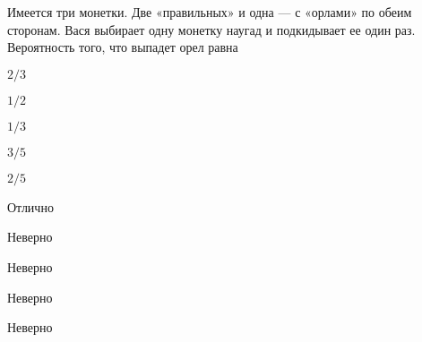 
\begin{question}
Имеется три монетки. Две «правильных» и одна --- с «орлами» по обеим
сторонам. Вася выбирает одну монетку наугад и подкидывает ее один раз.
Вероятность того, что выпадет орел равна
\begin{answerlist}
  \item \(2/3\)
  \item \(1/2\)
  \item \(1/3\)
  \item \(3/5\)
  \item \(2/5\)
\end{answerlist}
\end{question}

\begin{solution}
\begin{answerlist}
  \item Отлично
  \item Неверно
  \item Неверно
  \item Неверно
  \item Неверно
\end{answerlist}
\end{solution}

